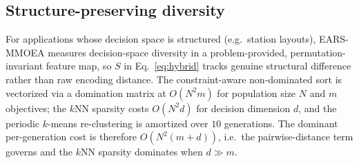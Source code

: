 \subsection{Structure-preserving diversity}
For applications whose decision space is structured (e.g.\ station layouts), EARS-MMOEA
measures decision-space diversity in a problem-provided, permutation-invariant feature
map, so $S$ in Eq.~\eqref{eq:hybrid} tracks genuine structural difference rather than raw
encoding distance. The constraint-aware non-dominated sort is vectorized via a domination
matrix at $O(N^2 m)$ for population size $N$ and $m$ objectives; the $k$NN sparsity costs
$O(N^2 d)$ for decision dimension $d$, and the periodic $k$-means re-clustering is amortized over
$10$ generations. The dominant per-generation cost is therefore $O\!\left(N^2(m{+}d)\right)$,
i.e.\ the pairwise-distance term governs and the $k$NN sparsity dominates when $d \gg m$.

